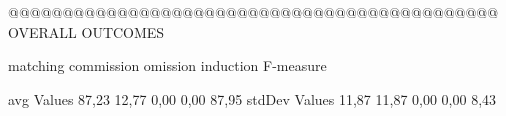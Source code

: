  @@@@@@@@@@@@@@@@@@@@@@@@@@@@@@@@@@@@@@@@@@@@@ OVERALL OUTCOMES

                matching commission   omission  induction   F-measure

avg Values       87,23       12,77       0,00       0,00       87,95        
stdDev Values    11,87        11,87       0,00       0,00       8,43        
